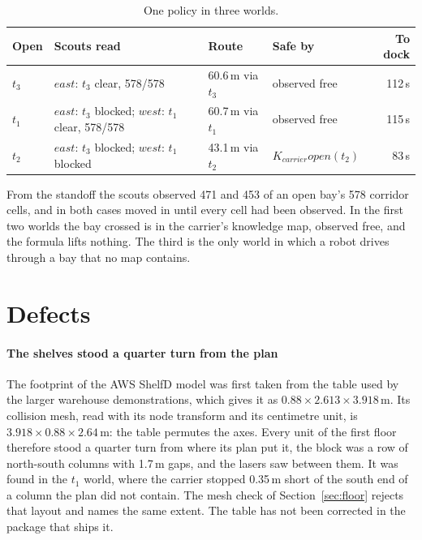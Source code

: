\documentclass[11pt,a4paper]{article}
\theoremstyle{definition}
\newcommand{\Kop}[1]{K_{#1}}
\newcommand{\ag}[1]{\mathit{#1}}
\newcommand{\op}{\mathit{open}}
\begin{document}
\begin{table}[H]
\centering\small
\caption{One policy in three worlds.}
\label{tab:worlds}
\begin{tabular}{@{}llllr@{}}
\toprule
\textbf{Open} & \textbf{Scouts read} & \textbf{Route} & \textbf{Safe by} & \textbf{To dock} \\
\midrule
$t_3$ & $\ag{east}$: $t_3$ clear, 578/578 & 60.6\,m via $t_3$ & observed free & 112\,s \\
$t_1$ & $\ag{east}$: $t_3$ blocked; $\ag{west}$: $t_1$ clear, 578/578 & 60.7\,m via $t_1$ & observed free & 115\,s \\
$t_2$ & $\ag{east}$: $t_3$ blocked; $\ag{west}$: $t_1$ blocked & 43.1\,m via $t_2$ & $\Kop{\ag{carrier}}\op(t_2)$ & 83\,s \\
\bottomrule
\end{tabular}
\end{table}

From the standoff the scouts observed 471 and 453 of an open bay's 578
corridor cells, and in both cases moved in until every cell had been observed.
In the first two worlds the bay crossed is in the carrier's knowledge map,
observed free, and the formula lifts nothing. The third is the only world in
which a robot drives through a bay that no map contains.

\section{Defects}
\label{sec:defects}

\paragraph{The shelves stood a quarter turn from the plan} The footprint of the
AWS ShelfD model was first taken from the table used by the larger warehouse
demonstrations, which gives it as $0.88 \times 2.613 \times 3.918$\,m. Its
collision mesh, read with its node transform and its centimetre unit, is
$3.918 \times 0.88 \times 2.64$\,m: the table permutes the axes. Every unit of
the first floor therefore stood a quarter turn from where its plan put it, the
block was a row of north-south columns with 1.7\,m gaps, and the lasers saw
between them. It was found in the $t_1$ world, where the carrier stopped
0.35\,m short of the south end of a column the plan did not contain. The mesh
check of Section~\ref{sec:floor} rejects that layout and names the same extent.
The table has not been corrected in the package that ships it.
\end{document}
